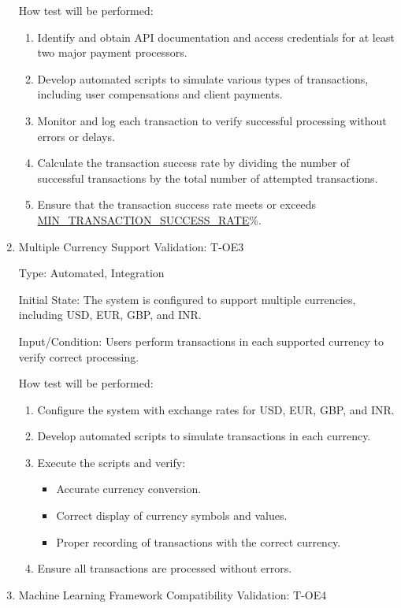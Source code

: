 \documentclass[12pt, titlepage]{article}
\begin{document}
\begin{enumerate}
How test will be performed:
\begin{enumerate}
    \item Identify and obtain API documentation and access credentials for at least two major payment processors.
    \item Develop automated scripts to simulate various types of transactions, including user compensations and client payments.
    \item Monitor and log each transaction to verify successful processing without errors or delays.
    \item Calculate the transaction success rate by dividing the number of successful transactions by the total number of attempted transactions.
    \item Ensure that the transaction success rate meets or exceeds \hyperref[MIN_TRANSACTION_SUCCESS_RATE]{MIN\_TRANSACTION\_SUCCESS\_RATE}\%.
\end{enumerate}

\item{Multiple Currency Support Validation: T-OE3\\}

Type: Automated, Integration

Initial State: The system is configured to support multiple currencies, including USD, EUR, GBP, and INR.

Input/Condition: Users perform transactions in each supported currency to verify correct processing.

How test will be performed:
\begin{enumerate}
    \item Configure the system with exchange rates for USD, EUR, GBP, and INR.
    \item Develop automated scripts to simulate transactions in each currency.
    \item Execute the scripts and verify:
    \begin{itemize}
        \item Accurate currency conversion.
        \item Correct display of currency symbols and values.
        \item Proper recording of transactions with the correct currency.
    \end{itemize}
    \item Ensure all transactions are processed without errors.
\end{enumerate}

\item{Machine Learning Framework Compatibility Validation: T-OE4\\}


\end{enumerate}
\end{document}
